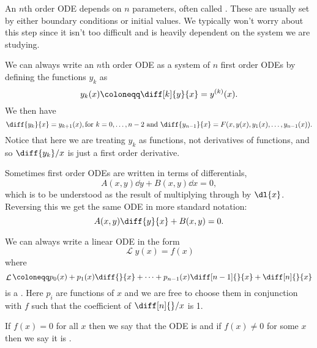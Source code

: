 \documentclass[fleqn]{NotesClass}
\DeclareMathOperator{\linop}{\mathcal{L}}
\begin{document}
    An \(n\)th order ODE depends on \(n\) parameters, often called .
    These are usually set by either boundary conditions or initial values.
    We typically won't worry about this step since it isn't too difficult and is heavily dependent on the system we are studying.
    
    We can always write an \(n\)th order ODE as a system of \(n\) first order ODEs by defining the functions \(y_k\) as
    \begin{equation}
        y_k(x) \coloneqq \diff[k]{y}{x} = y^{(k)}(x).
    \end{equation}
    We then have
    \begin{equation}
        \diff{y_k}{x} = y_{k+1}(x), \text{for \(k = 0, \dotsc, n - 2\) and } \diff{y_{n-1}}{x} = F(x, y(x), y_1(x), \dotsc, y_{n-1}(x)).
    \end{equation}
    Notice that here we are treating \(y_k\) as functions, not derivatives of functions, and so \(\diff{y_k}/{x}\) is just a first order derivative.
    
    Sometimes first order ODEs are written in terms of differentials,
    \begin{equation}
        A(x, y) \dd{y} + B(x, y) \dd{x} = 0,
    \end{equation}
    which is to be understood as the result of multiplying through by \(\dl{x}\).
    Reversing this we get the same ODE in more standard notation:
    \begin{equation}
        A(x, y) \diff{y}{x} + B(x, y) = 0.
    \end{equation}
    
    We can always write a linear ODE in the form
    \begin{equation}
        \linop y(x) = f(x)
    \end{equation}
    where
    \begin{equation}
        \linop \coloneqq p_0(x) + p_1(x)\diff{}{x} + \dotsb + p_{n-1}(x) \diff[n - 1]{}{x} + \diff[n]{}{x}
    \end{equation}
    is a .
    Here \(p_i\) are functions of \(x\) and we are free to choose them in conjunction with \(f\) such that the coefficient of \(\diff[n]{}/{x}\) is 1.
    
    If \(f(x) = 0\) for all \(x\) then we say that the ODE is  and if \(f(x) \ne 0\) for some \(x\) then we say it is .
    
    \backmatter
    \renewcommand{\glossaryname}{Acronyms}
    \printglossary[acronym]
    \printindex
\end{document}
